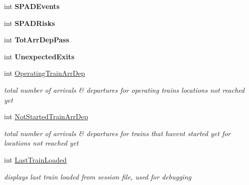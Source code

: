 \begin{DoxyCompactItemize}
\mbox{\label{class_t_train_controller_a273080615512d3a32b82a881af9dc5fb}} 
int {\bfseries S\+P\+A\+D\+Events}
\item 
\mbox{\label{class_t_train_controller_a5d93cb7e73c061071656b8fbd6bbfc72}} 
int {\bfseries S\+P\+A\+D\+Risks}
\item 
\mbox{\label{class_t_train_controller_a6bfae23b356d4450b4d93d863d876f57}} 
int {\bfseries Tot\+Arr\+Dep\+Pass}
\item 
\mbox{\label{class_t_train_controller_af64a32b0811b647196f8d25ac6701ddc}} 
int {\bfseries Unexpected\+Exits}
\item 
\mbox{\label{class_t_train_controller_a9b419c5f86d0815c35093bf3c25c6821}} 
int \mbox{\hyperlink{class_t_train_controller_a9b419c5f86d0815c35093bf3c25c6821}{Operating\+Train\+Arr\+Dep}}
\begin{DoxyCompactList}\small\item\em total number of arrivals \& departures for operating trains locations not reached yet \end{DoxyCompactList}\item 
\mbox{\label{class_t_train_controller_aa547b8fba4e19683055e67359d41a933}} 
int \mbox{\hyperlink{class_t_train_controller_aa547b8fba4e19683055e67359d41a933}{Not\+Started\+Train\+Arr\+Dep}}
\begin{DoxyCompactList}\small\item\em total number of arrivals \& departures for trains that haven\textquotesingle{}t started yet for locations not reached yet \end{DoxyCompactList}\item 
\mbox{\label{class_t_train_controller_afe81208f331c62fbf818e28098a5d750}} 
int \mbox{\hyperlink{class_t_train_controller_afe81208f331c62fbf818e28098a5d750}{Last\+Train\+Loaded}}
\begin{DoxyCompactList}\small\item\em displays last train loaded from session file, used for debugging \end{DoxyCompactList}\item 

\end{DoxyCompactItemize}
